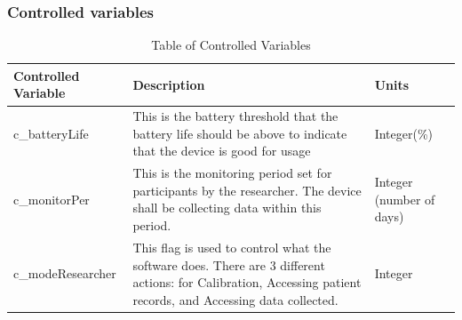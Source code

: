 \documentclass[12pt]{article}
\begin{document}
\subsubsection{Controlled variables}
\begin{table}[H]
\begin{tabular}{ |m{10em}|m{25em}|m{5em}| }
  \hline
  \rowcolor{LightCyan}
  \textbf{Controlled Variable} & \textbf{Description}                                                                                                          & \textbf{Units}           \\
  \hline
  \label{cBat}c\_batteryLife & This is the battery threshold that the battery life should be above to indicate that the device is good for usage             & Integer(\%)              \\
  \hline
  \label{cMon}c\_monitorPer  & This is the monitoring period set for participants by the researcher. The device shall be collecting data within this period. & Integer (number of days) \\
  \hline
  \label{cMod}c\_modeResearcher   & This flag is used to control what the software does. There are 3 different actions: for Calibration, Accessing patient records, and Accessing data collected. & Integer                  \\
  \hline
\end{tabular}
\caption{\label{conVar}Table of Controlled Variables}  
\end{table}
\end{document}
